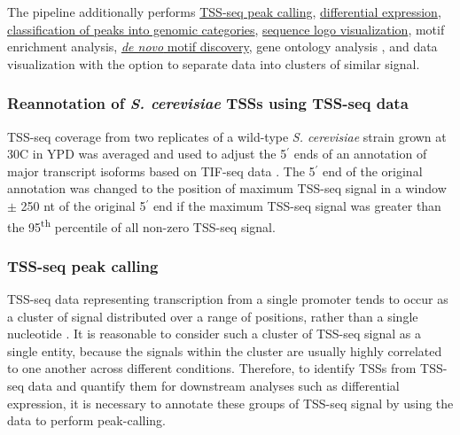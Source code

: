 The pipeline additionally performs \hyperref[subsubsec:tss_peak_calling]{TSS-seq peak calling}, \hyperref[subsubsec:tss_differential_expression]{differential expression}, \hyperref[subsubsec:tss_peak_classification]{classification of peaks into genomic categories}, \hyperref[subsubsec:tss_seqlogos]{sequence logo visualization}, motif enrichment analysis, \hyperref[subsubsec:denovo_motif_discovery]{\textit{de novo} motif discovery}, gene ontology analysis \citep{young2010}, and data visualization with the option to separate data into clusters of similar signal.

\subsubsection{Reannotation of \textit{S. cerevisiae} TSSs using TSS-seq data}
\label{subsubsec:tss_reannotation}

TSS-seq coverage from two replicates of a wild-type \textit{S. cerevisiae} strain grown at 30\textdegree C in YPD was averaged and used to adjust the 5$^\prime$ ends of an annotation of major transcript isoforms based on TIF-seq data \citep{pelechano2013}.
The 5$^\prime$ end of the original annotation was changed to the position of maximum TSS-seq signal in a window $\pm$ 250 nt of the original 5$^\prime$ end if the maximum TSS-seq signal was greater than the 95\textsuperscript{th} percentile of all non-zero TSS-seq signal.

\subsubsection{TSS-seq peak calling}
\label{subsubsec:tss_peak_calling}

TSS-seq data representing transcription from a single promoter tends to occur as a cluster of signal distributed over a range of positions, rather than a single nucleotide \citep{arribere2013, malabat2015}.
It is reasonable to consider such a cluster of TSS-seq signal as a single entity, because the signals within the cluster are usually highly correlated to one another across different conditions.
Therefore, to identify TSSs from TSS-seq data and quantify them for downstream analyses such as differential expression, it is necessary to annotate these groups of TSS-seq signal by using the data to perform peak-calling.

